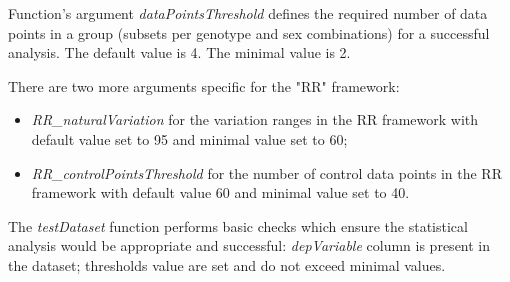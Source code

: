 \documentclass[12pt,a4paper]{article}
\begin{document}
Function's argument \textit{dataPointsThreshold} defines the required number of data points in a group (subsets per genotype and sex combinations) for a successful analysis. The default value is 4. The minimal value is 2.

There are two more arguments specific for the "RR" framework: 
\begin{itemize}
\item \textit{RR\_naturalVariation} for the variation ranges in the RR framework with default value set to 95 and minimal value set to 60; 
\item \textit{RR\_controlPointsThreshold} for the number of control data points in the RR framework with default value 60 and minimal value set to 40.
\end{itemize}

The \textit{testDataset} function performs basic checks which ensure the statistical analysis would be appropriate and successful: \textit{depVariable} column is present in the dataset; thresholds value are set and do not exceed minimal values.
\end{document}
